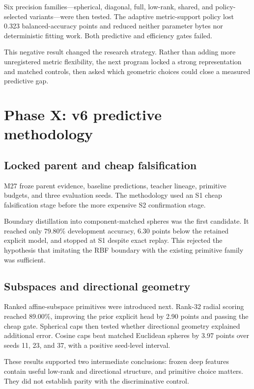 \documentclass[12pt,oneside]{report}
\begin{document}
Six precision families---spherical, diagonal, full, low-rank, shared, and
policy-selected variants---were then tested. The adaptive metric-support policy
lost 0.323 balanced-accuracy points and reduced neither parameter bytes nor
deterministic fitting work. Both predictive and efficiency gates failed.

This negative result changed the research strategy. Rather than adding more
unregistered metric flexibility, the next program locked a strong
representation and matched controls, then asked which geometric choices could
close a measured predictive gap.

\section{Phase X: v6 predictive methodology}

\subsection{Locked parent and cheap falsification}

M27 froze parent evidence, baseline predictions, teacher lineage, primitive
budgets, and three evaluation seeds. The methodology used an S1 cheap
falsification stage before the more expensive S2 confirmation stage.

Boundary distillation into component-matched spheres was the first candidate.
It reached only 79.80\% development accuracy, 6.30 points below the retained
explicit model, and stopped at S1 despite exact replay. This rejected the
hypothesis that imitating the RBF boundary with the existing primitive family
was sufficient.

\subsection{Subspaces and directional geometry}

Ranked affine-subspace primitives were introduced next. Rank-32 radial scoring
reached 89.00\%, improving the prior explicit head by 2.90 points and passing
the cheap gate. Spherical caps then tested whether directional geometry
explained additional error. Cosine caps beat matched Euclidean spheres by
3.97 points over seeds 11, 23, and 37, with a positive seed-level interval.

These results supported two intermediate conclusions: frozen deep features
contain useful low-rank and directional structure, and primitive choice matters.
They did not establish parity with the discriminative control.
\end{document}
